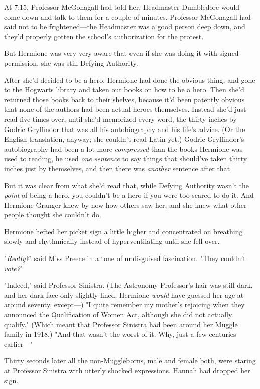 At 7:15\PM, Professor McGonagall had told her, Headmaster Dumbledore would come
down and talk to them for a couple of minutes. Professor McGonagall had said
not to be frightened---the Headmaster was a good person deep down, and they'd
properly gotten the school's authorization for the protest.

But Hermione was very very aware that even if she was doing it with signed
permission, she was still Defying Authority.

After she'd decided to be a hero, Hermione had done the obvious thing, and gone
to the Hogwarts library and taken out books on how to be a hero. Then she'd
returned those books back to their shelves, because it'd been patently obvious
that none of the authors had been actual heroes themselves. Instead she'd just
read five times over, until she'd memorized every word, the thirty inches by
Godric Gryffindor that was all his autobiography and his life's advice. (Or the
English translation, anyway; she couldn't read Latin yet.) Godric Gryffindor's
autobiography had been a lot more \emph{compressed} than the books Hermione was
used to reading, he used \emph{one sentence} to say things that should've taken
thirty inches just by themselves, and then there was \emph{another} sentence
after that{\el}

But it was clear from what she'd read that, while Defying Authority wasn't the
\emph{point} of being a hero, you couldn't be a hero if you were too scared to
do it. And Hermione Granger knew by now how others saw her, and she knew what
other people thought she couldn't do.

Hermione hefted her picket sign a little higher and concentrated on breathing
slowly and rhythmically instead of hyperventilating until she fell over.

"\emph{Really?}" said Miss Preece in a tone of undisguised fascination. "They
couldn't \emph{vote?}"

"Indeed," said Professor Sinistra. (The Astronomy Professor's hair was still
dark, and her dark face only slightly lined; Hermione \emph{would} have guessed
her age at around seventy, except---) "I quite remember my mother's rejoicing
when they announced the Qualification of Women Act, although she did not
actually qualify." (Which meant that Professor Sinistra had been around her
Muggle family in 1918.) "And that wasn't the worst of it. Why, just a few
centuries earlier---"

Thirty seconds later all the non-Muggleborns, male and female both, were
staring at Professor Sinistra with utterly shocked expressions. Hannah had
dropped her sign.

